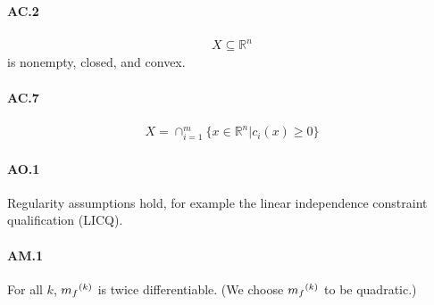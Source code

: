 \documentclass{article}
\begin{document}
\paragraph{AC.2}
\begin{align}
X  \subseteq \mathbb R^n
\end{align}
is nonempty, closed, and convex.


\paragraph{AC.7}
\begin{align}
X = \cap_{i=1}^{m} \{x\in\mathbb R^n|c_i(x) \ge 0\}
\end{align}


\paragraph{AO.1}
Regularity assumptions hold, for example the linear independence constraint qualification (LICQ).

\paragraph{AM.1}
For all $k$, ${{m}_f}^{(k)}$ is twice differentiable. (We choose ${{m}_f}^{(k)}$ to be quadratic.)

\end{document}
